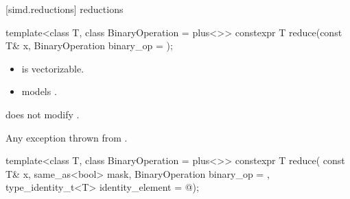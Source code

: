 [simd.reductions]{ reductions}

\begin{itemdecl}
template<class T, class BinaryOperation = plus<>>
  constexpr T reduce(const T& x, BinaryOperation binary_op = {});
\end{itemdecl}

\begin{itemdescr}
  \pnum\constraints
  \begin{itemize}
    \item {} is vectorizable.

    \item {} models .
  \end{itemize}
  \pnum\expects
   does not modify .

  \pnum\returns {}

  \pnum\throws
  Any exception thrown from .
\end{itemdescr}

\begin{itemdecl}
template<class T, class BinaryOperation = plus<>>
  constexpr T reduce(
    const T& x, same_as<bool> mask,
    BinaryOperation binary_op = {}, type_identity_t<T> identity_element = @\seebelow@);
\end{itemdecl}

